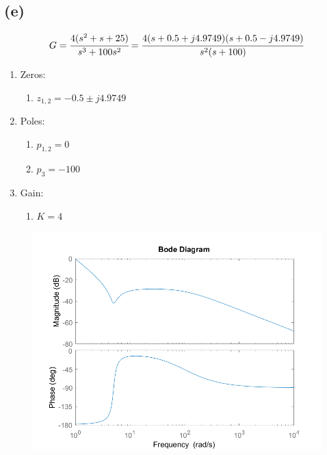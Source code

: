 \documentclass[letter]{article}
\numberwithin{equation}{section}
\begin{document}
\subsection{(e)}
\[
	G = \cfrac{
		4 (s^2 + s + 25)
	}{
		s^3 + 100s^2
	}
	= \cfrac{
		4 (s + 0.5 + j 4.9749) (s + 0.5 - j 4.9749)
	}{
		s^2 (s+100)
	}
\]
\begin{enumerate}
	\item Zeros:
	\begin{enumerate}
		\item $z_{1,2} = -0.5 \pm j 4.9749$
	\end{enumerate}
	\item Poles:
	\begin{enumerate}
		\item $p_{1,2} = 0$
		\item $p_3 = -100$
	\end{enumerate}
	\item Gain:
	\begin{enumerate}
		\item $K = 4$
	\end{enumerate}
\end{enumerate}

\begin{figure}[h!]
	\centering
	\includegraphics[width=\textwidth]{figs/pblm2e.png}
\end{figure}



\newpage
\end{document}
